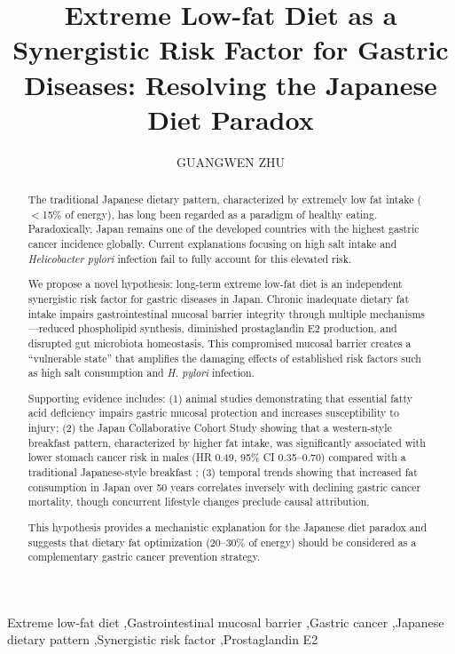 \documentclass[review]{elsarticle}
\begin{document}
\begin{frontmatter}

\title{Extreme Low-fat Diet as a Synergistic Risk Factor for Gastric Diseases: Resolving the Japanese Diet Paradox}

\author[inst1]{GUANGWEN ZHU}



\begin{abstract}
The traditional Japanese dietary pattern, characterized by extremely low fat intake ($<$15\% of energy), has long been regarded as a paradigm of healthy eating. Paradoxically, Japan remains one of the developed countries with the highest gastric cancer incidence globally. Current explanations focusing on high salt intake and \textit{Helicobacter pylori} infection fail to fully account for this elevated risk. 

We propose a novel hypothesis: long-term extreme low-fat diet is an independent synergistic risk factor for gastric diseases in Japan. Chronic inadequate dietary fat intake impairs gastrointestinal mucosal barrier integrity through multiple mechanisms---reduced phospholipid synthesis, diminished prostaglandin E2 production, and disrupted gut microbiota homeostasis. This compromised mucosal barrier creates a ``vulnerable state'' that amplifies the damaging effects of established risk factors such as high salt consumption and \textit{H. pylori} infection.

Supporting evidence includes: (1) animal studies demonstrating that essential fatty acid deficiency impairs gastric mucosal protection and increases susceptibility to injury; (2) the Japan Collaborative Cohort Study showing that a western-style breakfast pattern, characterized by higher fat intake, was significantly associated with lower stomach cancer risk in males (HR 0.49, 95\% CI 0.35--0.70) compared with a traditional Japanese-style breakfast \cite{tokui2005}; (3) temporal trends showing that increased fat consumption in Japan over 50 years correlates inversely with declining gastric cancer mortality, though concurrent lifestyle changes preclude causal attribution. 

This hypothesis provides a mechanistic explanation for the Japanese diet paradox and suggests that dietary fat optimization (20--30\% of energy) should be considered as a complementary gastric cancer prevention strategy.
\end{abstract}

\begin{keyword}
Extreme low-fat diet \sep Gastrointestinal mucosal barrier \sep Gastric cancer \sep Japanese dietary pattern \sep Synergistic risk factor \sep Prostaglandin E2
\end{keyword}

\end{frontmatter}
\end{document}
